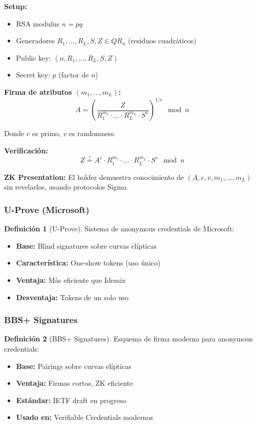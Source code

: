 \documentclass[11pt,a4paper,twoside]{book}
\theoremstyle{definition}
\newtheorem{definition}{Definición}[chapter]
\theoremstyle{remark}
\begin{document}
\begin{mathnote}
\textbf{Setup:}
\begin{itemize}
    \item RSA modulus $n = pq$
    \item Generadores $R_1, ..., R_L, S, Z \in QR_n$ (residuos cuadráticos)
    \item Public key: $(n, R_1, ..., R_L, S, Z)$
    \item Secret key: $p$ (factor de $n$)
\end{itemize}

\textbf{Firma de atributos $(m_1, ..., m_L)$:}
\[
A = \left( \frac{Z}{R_1^{m_1} \cdot ... \cdot R_L^{m_L} \cdot S^v} \right)^{1/e} \mod n
\]

Donde $e$ es primo, $v$ es randomness.

\textbf{Verificación:}
\[
Z \stackrel{?}{=} A^e \cdot R_1^{m_1} \cdot ... \cdot R_L^{m_L} \cdot S^v \mod n
\]

\textbf{ZK Presentation:}
El holder demuestra conocimiento de $(A, e, v, m_1, ..., m_L)$ sin revelarlos, usando protocolos Sigma.
\end{mathnote}

\subsubsection{U-Prove (Microsoft)}

\begin{definition}[U-Prove]
Sistema de anonymous credentials de Microsoft:
\begin{itemize}
    \item \textbf{Base:} Blind signatures sobre curvas elípticas
    \item \textbf{Característica:} One-show tokens (uso único)
    \item \textbf{Ventaja:} Más eficiente que Idemix
    \item \textbf{Desventaja:} Tokens de un solo uso
\end{itemize}
\end{definition}

\subsubsection{BBS+ Signatures}

\begin{definition}[BBS+ Signatures]
Esquema de firma moderna para anonymous credentials:
\begin{itemize}
    \item \textbf{Base:} Pairings sobre curvas elípticas
    \item \textbf{Ventaja:} Firmas cortas, ZK eficiente
    \item \textbf{Estándar:} IETF draft en progreso
    \item \textbf{Usado en:} Verifiable Credentials modernos
\end{itemize}
\end{definition}
\end{document}
